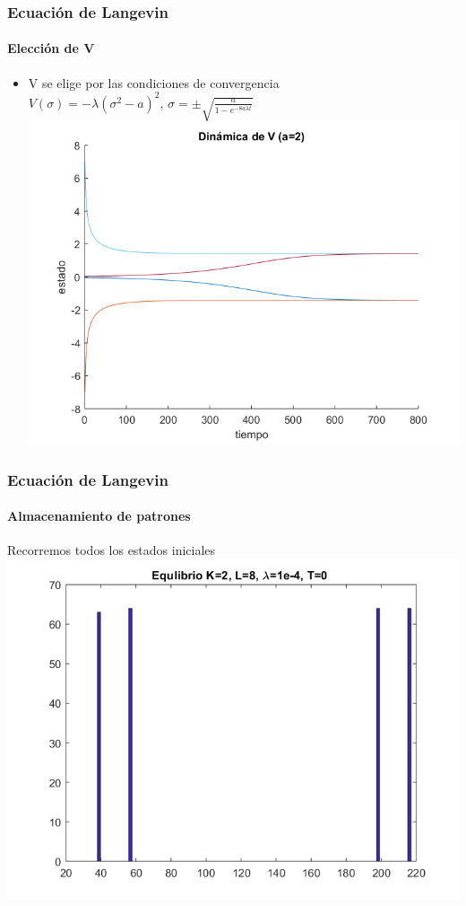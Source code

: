 \documentclass[11pt]{beamer}
\begin{document}
\begin{frame}
\frametitle{Ecuación de Langevin}
\framesubtitle{Elección de V}
\begin{itemize}
	\item V se elige por las condiciones de convergencia\\
	$V(\sigma)=-\lambda(\sigma^2-a)^2$, 
	$\sigma=\pm \sqrt{
	\frac{a}
	{1-e^{-8a \lambda t}}
	}$\\
	\includegraphics[scale=0.3]{potencial}
\end{itemize}
\end{frame}
\begin{frame}
\frametitle{Ecuación de Langevin}
\framesubtitle{Almacenamiento de patrones}

 Recorremos todos los estados iniciales
	\includegraphics[scale=0.5]{k2l8t0}


\end{frame}
\end{document}
